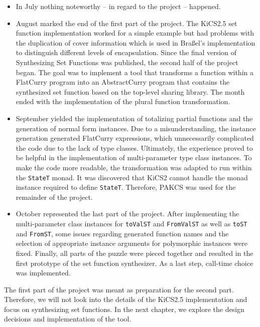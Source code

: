 \documentclass[a4paper, 11pt, fleqn]{scrreprt}
\newcommand{\cinline}[1]{\texttt{#1}}
\begin{document}
\begin{itemize}
    \item In July nothing noteworthy -- in regard to the project -- happened.
    \item August marked the end of the first part of the project. The KiCS2.5 set function implementation worked for a simple example but had problems with the duplication of cover information which is used in Braßel's implementation to distinguish different levels of encapsulation. Since the final version of Synthesizing Set Functions was published, the second half of the project began. The goal was to implement a tool that transforms a function within a FlatCurry program into an AbstractCurry program that contains the synthesized set function based on the top-level sharing library. The month ended with the implementation of the plural function transformation.
    \item September yielded the implementation of totalizing partial functions and the generation of normal form instances. Due to a misunderstanding, the instance generation generated FlatCurry expressions, which unnecessarily complicated the code due to the lack of type classes. Ultimately, the experience proved to be helpful in the implementation of  multi-parameter type class instances. To make the code more readable, the transformation was adapted to run within the \cinline{StateT} monad. It was discovered that KiCS2 cannot handle the monad instance required to define \cinline{StateT}.  Therefore, PAKCS was used for the remainder of the project.
    \item October represented the last part of the project. After implementing the multi-parameter class instances for \cinline{toValST} and \cinline{FromValST} as well as \cinline{toST} and \cinline{FromST}, some issues regarding generated function names and the selection of appropriate instance arguments for polymorphic instances were fixed. Finally, all parts of the puzzle were pieced together and resulted in the first prototype of the set function synthesizer. As a last step, call-time choice was implemented. 
\end{itemize}
The first part of the project was meant as preparation for the second part. Therefore, we will not look into the details of the KiCS2.5 implementation and focus on synthesizing set functions. In the next chapter, we explore the design decisions and implementation of the tool.
\end{document}
